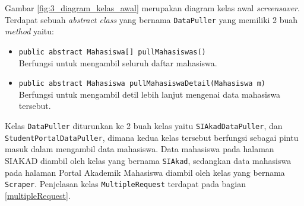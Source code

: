 Gambar \ref{fig:3_diagram_kelas_awal} merupakan diagram kelas awal \textit{screensaver}. Terdapat sebuah \textit{abstract class} yang bernama \texttt{DataPuller} yang memiliki 2 buah \textit{method} yaitu:
\begin{itemize}
	\item \texttt{public abstract Mahasiswa[] pullMahasiswas()}\\
        Berfungsi untuk mengambil seluruh daftar mahasiswa.
	\item \texttt{public abstract Mahasiswa pullMahasiswaDetail(Mahasiswa m)}\\
	    Berfungsi untuk mengambil detil lebih lanjut mengenai data mahasiswa tersebut.
\end{itemize}
Kelas \texttt{DataPuller} diturunkan ke 2 buah kelas yaitu \texttt{SIAkadDataPuller}, dan \texttt{StudentPortalDataPuller}, dimana kedua kelas tersebut berfungsi sebagai pintu masuk dalam mengambil data mahasiswa. Data mahasiswa pada halaman SIAKAD diambil oleh kelas yang bernama \texttt{SIAkad}, sedangkan data mahasiswa pada halaman Portal Akademik Mahasiswa diambil oleh kelas yang bernama \texttt{Scraper}. Penjelasan kelas \texttt{MultipleRequest} terdapat pada bagian \ref{multipleRequest}.